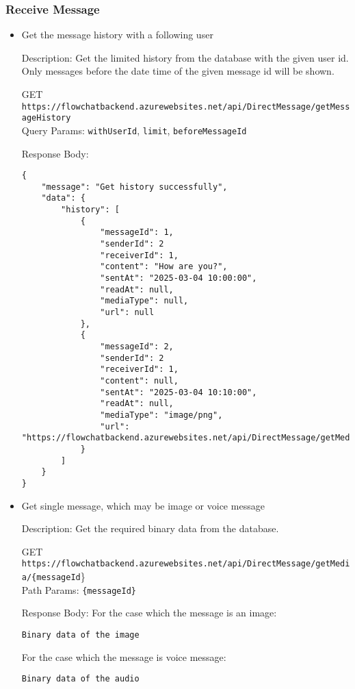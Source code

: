 \documentclass[11pt, a4paper]{article}
\begin{document}
\subsubsection{Receive Message}
\begin{itemize}
    \item Get the message history with a following user

    Description: Get the limited history from the database with the given user id. Only messages before the date time of the given message id will be shown.
    
    GET \texttt{https://flowchatbackend.azurewebsites.net/api/DirectMessage/getMessageHistory}\\    
    Query Params: \verb|withUserId|, \verb|limit|, \verb|beforeMessageId|
    
    Response Body:
    \begin{lstlisting}[breaklines=true, frame=single]
{
    "message": "Get history successfully",
    "data": {
        "history": [
            {
                "messageId": 1,
                "senderId": 2
                "receiverId": 1,
                "content": "How are you?",
                "sentAt": "2025-03-04 10:00:00",
                "readAt": null,
                "mediaType": null,
                "url": null
            },
            {
                "messageId": 2,
                "senderId": 2
                "receiverId": 1,
                "content": null,
                "sentAt": "2025-03-04 10:10:00",
                "readAt": null,
                "mediaType": "image/png",
                "url": "https://flowchatbackend.azurewebsites.net/api/DirectMessage/getMedia/2"
            }
        ]
    }
}
    \end{lstlisting}    

    \item Get single message, which may be image or voice message

    Description: Get the required binary data from the database.
    
    GET \texttt{https://flowchatbackend.azurewebsites.net/api/DirectMessage/getMedia/\{messageId}\}\\    
    Path Params: \verb|{messageId}|
    
    Response Body:
    For the case which the message is an image:
    \begin{lstlisting}[breaklines=true, frame=single]
Binary data of the image
    \end{lstlisting}

    For the case which the message is voice message:
    \begin{lstlisting}[breaklines=true, frame=single]
Binary data of the audio
    \end{lstlisting}
\end{itemize}
\end{document}
